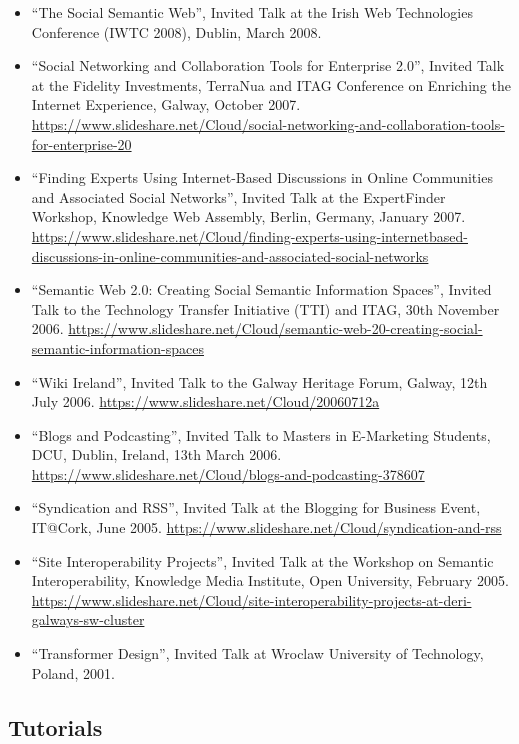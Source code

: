 \documentclass[10pt,a4paper]{res} %
\begin{document}
\begin{resume}
\begin{itemize}
\item ``The Social Semantic Web'', Invited Talk at the Irish Web Technologies Conference (IWTC 2008), Dublin, March 2008. %
\item ``Social Networking and Collaboration Tools for Enterprise 2.0'', Invited Talk at the Fidelity Investments, TerraNua and ITAG Conference on Enriching the Internet Experience, Galway, October 2007. \url{https://www.slideshare.net/Cloud/social-networking-and-collaboration-tools-for-enterprise-20}
\item ``Finding Experts Using Internet-Based Discussions in Online Communities and Associated Social Networks'', Invited Talk at the ExpertFinder Workshop, Knowledge Web Assembly, Berlin, Germany, January 2007. \url{https://www.slideshare.net/Cloud/finding-experts-using-internetbased-discussions-in-online-communities-and-associated-social-networks}
\item ``Semantic Web 2.0: Creating Social Semantic Information Spaces'', Invited Talk to the Technology Transfer Initiative (TTI) and ITAG, 30th November 2006. \url{https://www.slideshare.net/Cloud/semantic-web-20-creating-social-semantic-information-spaces}
\item ``Wiki Ireland'', Invited Talk to the Galway Heritage Forum, Galway, 12th July 2006. \url{https://www.slideshare.net/Cloud/20060712a}
\item ``Blogs and Podcasting'', Invited Talk to Masters in E-Marketing Students, DCU, Dublin, Ireland, 13th March 2006. \url{https://www.slideshare.net/Cloud/blogs-and-podcasting-378607}
\item ``Syndication and RSS'', Invited Talk at the Blogging for Business Event, IT@Cork, June 2005. \url{https://www.slideshare.net/Cloud/syndication-and-rss}
\item ``Site Interoperability Projects'', Invited Talk at the Workshop on Semantic Interoperability, Knowledge Media Institute, Open University, February 2005. \url{https://www.slideshare.net/Cloud/site-interoperability-projects-at-deri-galways-sw-cluster}
\item ``Transformer Design'', Invited Talk at Wroclaw University of Technology, Poland, 2001. %
\end{itemize}

\subsection*{Tutorials}


\end{resume}
\end{document}
